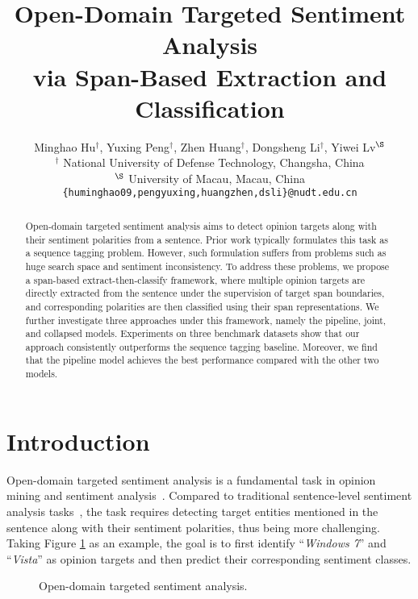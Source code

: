 \documentclass[11pt,a4paper]{article}
\title{Open-Domain Targeted Sentiment Analysis \\ via Span-Based Extraction and Classification}
\author{
Minghao Hu$^\dag$,
Yuxing Peng$^\dag$,
Zhen Huang$^\dag$,
Dongsheng Li$^\dag$,
Yiwei Lv$^\S$ \\
$^\dag$ National University of Defense Technology, Changsha, China \\
$^\S$ University of Macau, Macau, China  \\
{\tt \{huminghao09,pengyuxing,huangzhen,dsli\}@nudt.edu.cn} \\
}
\date{}
\begin{document}
\maketitle

\begin{abstract}

Open-domain targeted sentiment analysis aims to detect opinion targets along with their sentiment polarities from a sentence.
Prior work typically formulates this task as a sequence tagging problem.
However, such formulation suffers from problems such as huge search space and sentiment inconsistency.
To address these problems, we propose a span-based extract-then-classify framework, where multiple opinion targets are directly extracted from the sentence under the supervision of target span boundaries, and corresponding polarities are then classified using their span representations.
We further investigate three approaches under this framework, namely the pipeline, joint, and collapsed models.
Experiments on three benchmark datasets show that our approach consistently outperforms the sequence tagging baseline.
Moreover, we find that the pipeline model achieves the best performance compared with the other two models.

\end{abstract} \section{Introduction	\label{intro}}
Open-domain targeted sentiment analysis is a fundamental task in opinion mining and sentiment analysis~\cite{pang2008opinion,liu2012sentiment}.
Compared to traditional sentence-level sentiment analysis tasks~\cite{lin2009joint,kim2014convolutional}, the task requires detecting target entities mentioned in the sentence along with their sentiment polarities, thus being more challenging.
Taking Figure \ref{fig:example} as an example, the goal is to first identify ``\emph{Windows 7}'' and ``\emph{Vista}'' as opinion targets and then predict their corresponding sentiment classes.

\begin{figure}[h]
\center
{}
\caption{Open-domain targeted sentiment analysis.}
\label{fig:example}
\end{figure}
\end{document}
